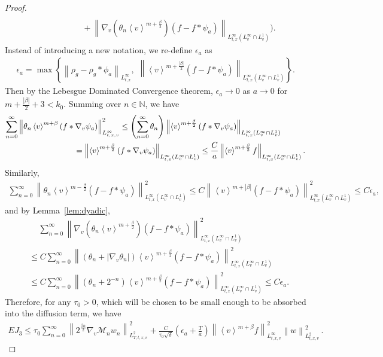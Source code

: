 \documentclass[11pt,american, reqno]{amsart}
\numberwithin{equation}{section}
\newcommand{\N}{\mathbb N}
\newcommand{\1}{\mathds{1}}
\newcommand{\CalM}{\mathcal{M}}
\newcommand{\vpran}[1]{\left(#1\right)}
\newcommand{\Eps}{\epsilon}
\newcommand{\norm}[1]{\left\lVert#1\right\rVert}
\newcommand{\vint}[1]{\left\langle#1\right\rangle}
\numberwithin{equation}{section}
\begin{document}
\begin{proof}
\begin{align}
\\
& \hspace{2cm}
+ \norm{\nabla_v \vpran{\theta_n
 \vint{v}^{m+\frac{\beta}{2}}} \vpran{f - f \ast \psi_a}}_{L^\infty_{t,x}(L^\infty_v \cap L^1_v)}
 \Big). 
\end{align}
Instead of introducing a new notation, we re-define $\Eps_a$ as
\begin{align*}
\Eps_a
= \max\left\{\norm{\rho_g - \rho_g \ast \phi_a}_{L^\infty_{t,x}}, \,\,
\norm{\vint{v}^{m+\frac{|\beta|}{2}} \vpran{f - f \ast \psi_a}}_{L^\infty_{t,x}(L^\infty_v \cap L^1_v)} \right\}. 
\end{align*}
Then by the Lebesgue Dominated Convergence theorem, $\Eps_a \to 0$ as $a \to 0$ for $m+\frac{|\beta|}{2} + 3 < k_0$.
Summing over $n \in \N$, we have
\begin{align*}
 \sum_{n=0}^\infty
\norm{\theta_n \vint{v}^{m+\beta} \vpran{f \ast \nabla_v\psi_a}}_{L^\infty_{t,x,v}}^2
&\leq 
 \vpran{\sum_{n=0}^\infty \theta_n}
\norm{\vint{v}^{m+\frac{\beta}{2}} \vpran{f \ast \nabla_v\psi_a}}_{L^\infty_{t,x}(L^\infty_v \cap L^1_v)}
\\
& \hspace{-2cm}
= \norm{\vint{v}^{m+\frac{\beta}{2}} \vpran{f \ast \nabla_v\psi_a}}_{L^\infty_{t,x}(L^\infty_v \cap L^1_v)}
\leq
\frac{C}{a} \norm{\vint{v}^{m+\frac{\beta}{2}} f}_{L^\infty_{t,x}(L^\infty_v \cap L^1_v)}.
\end{align*}
Similarly, 
\begin{align*}
 \sum_{n=0}^\infty
 \norm{\theta_n
 \vint{v}^{m-\frac{\beta}{2}} \vpran{f - f \ast \psi_a}}_{L^\infty_{t,x}(L^\infty_v \cap L^1_v)}^2
\leq
 C \norm{\vint{v}^{m+|\beta|} \vpran{f - f \ast \psi_a}}_{L^\infty_{t,x}(L^\infty_v \cap L^1_v)}^2
\leq C \Eps_a,
\end{align*}
and by Lemma~\ref{lem:dyadic}, 
\begin{align*}
& \quad \,
 \sum_{n=0}^\infty
\norm{\nabla_v \vpran{\theta_n
 \vint{v}^{m+\frac{\beta}{2}}} \vpran{f - f \ast \psi_a}}_{L^\infty_{t,x}(L^\infty_v \cap L^1_v)}^2
\\
& \leq
 C \sum_{n=0}^\infty
\norm{\vpran{\theta_n + |\nabla_v \theta_n|}
 \vint{v}^{m+\frac{\beta}{2}} \vpran{f - f \ast \psi_a}}_{L^\infty_{t,x}(L^\infty_v \cap L^1_v)}^2
\\
& \leq
 C \sum_{n=0}^\infty
\norm{\vpran{\theta_n + 2^{-n}}
 \vint{v}^{m+\frac{\beta}{2}} \vpran{f - f \ast \psi_a}}_{L^\infty_{t,x}(L^\infty_v \cap L^1_v)}^2
 \leq C \Eps_a. 
\end{align*}
Therefore, for any $\tau_0 > 0$, which will be chosen to be small enough to be absorbed into the diffusion term, we have
\begin{align} \label{est:EJ-3}
 EJ_3
\leq
 \tau_0 \sum_{n=0}^\infty
 \norm{2^{\frac{\beta n}{2}} \nabla_v \CalM_n w_n}_{L^2_{T,t,x,v}}^2
+ \frac{C}{\tau_0 \sqrt{\delta}}
  \vpran{\Eps_a + \frac{T}{a}} \norm{\vint{v}^{m+\beta} f}_{L^\infty_{t,x,v}}^2
\norm{w}_{L^2_{t,x,v}}^2\,.
\end{align}


\end{proof}
\end{document}
